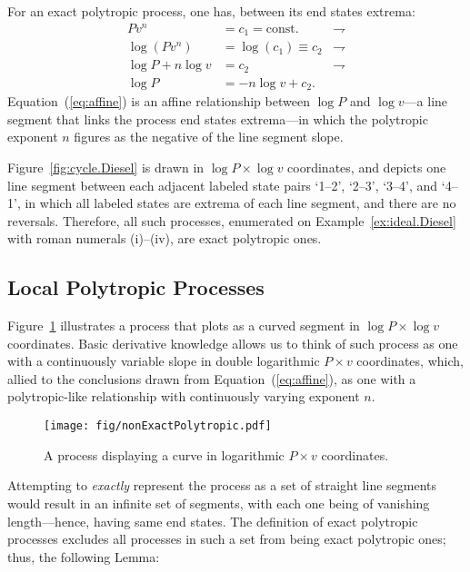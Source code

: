 \documentclass[fleqn,11pt]{SelfArx}
\begin{document}
    For an exact polytropic process, one has, between its end states extrema:%
    \begin{align}
        Pv^n & = c_1 = \text{const.}        & \rightharpoondown\\
        \log(Pv^n) & = \log(c_1) \equiv c_2 & \rightharpoondown\\
        \log P + n\log v & = c_2            & \rightharpoondown\\
        \log P & = -n\log v + c_2. \label{eq:affine}
    \end{align}
    Equation~(\ref{eq:affine}) is an affine relationship between $\log P$ and $\log v$---a  line
    segment that links the process end states extrema---in which  the  polytropic  exponent  $n$
    figures as the negative of the line segment slope.

    Figure~\ref{fig:cycle.Diesel} is drawn in $\log P \times \log v$  coordinates,  and  depicts
    one line segment between each adjacent labeled  state  pairs  `1--2',  `2--3',  `3--4',  and
    `4--1', in which all labeled states are extrema of each  line  segment,  and  there  are  no
    reversals. Therefore, all such processes, enumerated on  Example~\ref{ex:ideal.Diesel}  with
    roman numerals (i)--(iv), are exact polytropic ones.

    \subsection{Local Polytropic Processes}\label{sec:local}

    Figure~\ref{fig:non.exact} illustrates a process that plots as a curved segment in  $\log  P
    \times \log v$ coordinates. Basic derivative knowledge allows us to think of such process as
    one with a continuously variable slope in double logarithmic $P\times v$ coordinates, which,
    allied  to  the  conclusions  drawn  from  Equation~(\ref{eq:affine}),   as   one   with   a
    polytropic-like relationship with continuously varying exponent $n$.

    \begin{figure}[ht]
        \centering
        \texttt{[image: fig/nonExactPolytropic.pdf]}
        \caption{A process displaying a curve in logarithmic $P\times v$ coordinates.}
        \label{fig:non.exact}
    \end{figure}

    Attempting to \emph{exactly} represent the process as a set of straight line segments  would
    result in an infinite set of segments, with each  one  being  of  vanishing  length---hence,
    having same end states. The definition of exact polytropic processes excludes all  processes
    in such a set from being exact polytropic ones; thus, the following Lemma:
\end{document}
